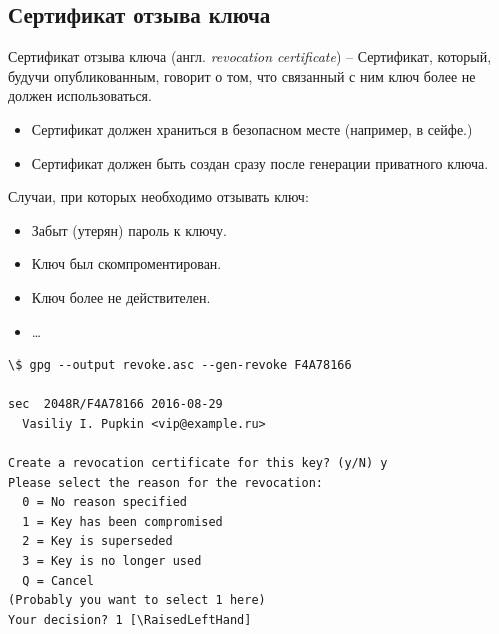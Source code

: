 \documentclass[presentation]{beamer}
\newcommand{\RaisedLeftHand}{%
  \raisebox{-.50em}{\Large\HandLeft}
}
\newcommand{\EndOfSectionOrnament}{
  \begin{center}
    \pgfornament[width=0.5\textwidth]{88}
    \end{center}
}
\begin{document}


\subsection{Сертификат отзыва ключа}

\begin{frame}[fragile]{}
  \raisebox{-.30em}{\Large\HandRight}\hspace{.25em} Сертификат отзыва
  ключа (англ. \emph{revocation certificate}) -- Сертификат, который,
  будучи опубликованным, говорит о том, что связанный с ним ключ более
  не должен использоваться.\newline

  \begin{itemize}
  \item Сертификат должен храниться в безопасном месте (например, в
    сейфе.)
  \item Сертификат должен быть создан сразу после генерации приватного
    ключа.\newline
  \end{itemize}
  
  Случаи, при которых необходимо отзывать ключ:
  \begin{itemize}
  \item Забыт (утерян) пароль к ключу.
  \item Ключ был скомпроментирован.
  \item Ключ более не действителен.
  \item \ldots{}
  \end{itemize}
\end{frame}

\begin{frame}[fragile]{}
  \small
\begin{Verbatim}[commandchars=\\\[\]]
\$ gpg --output revoke.asc --gen-revoke F4A78166

sec  2048R/F4A78166 2016-08-29
  Vasiliy I. Pupkin <vip@example.ru>

Create a revocation certificate for this key? (y/N) y
Please select the reason for the revocation:
  0 = No reason specified
  1 = Key has been compromised
  2 = Key is superseded
  3 = Key is no longer used
  Q = Cancel
(Probably you want to select 1 here)
Your decision? 1 [\RaisedLeftHand]
\end{Verbatim}
\normalsize
\EndOfSectionOrnament
\end{frame}
\end{document}
